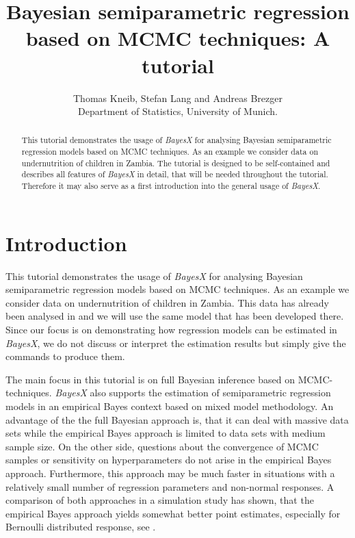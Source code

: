 \documentclass[a4paper]{article}
\begin{document}
\title{Bayesian semiparametric regression based on MCMC techniques: A tutorial}
\author{Thomas Kneib, Stefan Lang and Andreas Brezger\\ [.25cm]
\normalsize Department of Statistics, University of Munich. }
\maketitle

\begin{abstract}
This tutorial demonstrates the usage of {\it BayesX} for analysing
Bayesian semiparametric regression models based on MCMC
techniques. As an example we consider data on undernutrition of
children in Zambia. The tutorial is designed to be self-contained
and describes all features of {\it BayesX} in detail, that will be
needed throughout the tutorial. Therefore it may also serve as a
first introduction into the general usage of {\em BayesX}.
\end{abstract}

\tableofcontents

\newpage
\section{Introduction}\label{data}

This tutorial demonstrates the usage of {\it BayesX} for analysing
Bayesian semiparametric regression models based on MCMC
techniques. As an example we consider data on undernutrition of
children in Zambia. This data has already been analysed in  and we will use the same model
that has been developed there. Since our focus is on demonstrating
how regression models can be estimated in {\em BayesX}, we do not
discuss or interpret the estimation results but simply give the
commands to produce them.

The main focus in this tutorial is on full Bayesian inference based
on MCMC-techniques. {\it BayesX} also supports the estimation of
semiparametric regression models in an empirical Bayes context based
on mixed model methodology. An advantage of the the full Bayesian
approach is, that it can deal with massive data sets while the
empirical Bayes approach is limited to data sets with medium sample
size. On the other side, questions about the convergence of MCMC
samples or sensitivity on hyperparameters do not arise in the
empirical Bayes approach. Furthermore, this approach may be much
faster in situations with a relatively small number of regression
parameters and non-normal responses. A comparison of both approaches
in a simulation study has shown, that the empirical Bayes approach
yields somewhat better point estimates, especially for Bernoulli
distributed response, see .
\end{document}
